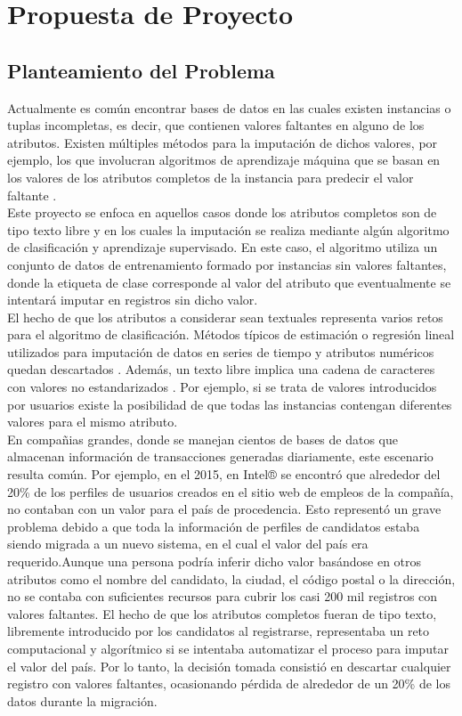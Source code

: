 \chapter{Propuesta de Proyecto}
\section{Planteamiento del Problema}
Actualmente es común encontrar bases de datos en las cuales existen instancias o tuplas incompletas, es decir, que contienen valores faltantes en alguno de los atributos. Existen múltiples métodos para la imputación de dichos valores, por ejemplo, los que involucran algoritmos de aprendizaje máquina que se basan en los valores de los atributos completos de la instancia para predecir el valor faltante \cite{tran2015multiple,ishioka2014investigations}.\\
Este proyecto se enfoca en aquellos casos donde los atributos completos son de tipo texto libre y en los cuales la imputación se realiza mediante algún algoritmo de clasificación y aprendizaje supervisado. En este caso, el algoritmo utiliza un conjunto de datos de entrenamiento formado por instancias sin valores faltantes, donde la etiqueta de clase corresponde al valor del atributo que eventualmente se intentará imputar en registros sin dicho valor.\\
El hecho de que los atributos a considerar sean textuales representa varios retos para el algoritmo de clasificación. Métodos típicos de estimación o regresión lineal utilizados para imputación de datos en series de tiempo y atributos numéricos quedan descartados \cite{mavai2014survey}. Además, un texto libre implica una cadena de caracteres con valores no estandarizados \cite{khan2006comparison}. Por ejemplo, si se trata de valores introducidos por usuarios existe la posibilidad de que todas las instancias contengan diferentes valores para el mismo atributo.\\
En compañias grandes, donde se manejan cientos de bases de datos que almacenan información de transacciones generadas diariamente, este escenario resulta común. Por ejemplo, en el 2015, en Intel® se encontró que alrededor del 20\% de los perfiles de usuarios creados en el sitio web de empleos de la compañía, no contaban con un valor para el país de procedencia. Esto representó un grave problema debido a que toda la información de perfiles de candidatos estaba siendo migrada a un nuevo sistema, en el cual el valor del país era requerido.Aunque una persona podría inferir dicho valor basándose en otros atributos como el nombre del candidato, la ciudad, el código postal o la dirección, no se contaba con suficientes recursos para cubrir los casi 200 mil registros con valores faltantes. El hecho de que los atributos completos fueran de tipo texto, libremente introducido por los candidatos al registrarse, representaba un reto computacional y algorítmico si se intentaba automatizar el proceso para imputar el valor del país. Por lo tanto, la decisión tomada consistió en descartar cualquier registro con valores faltantes, ocasionando pérdida de alrededor de un 20\% de los datos durante la migración.\\
